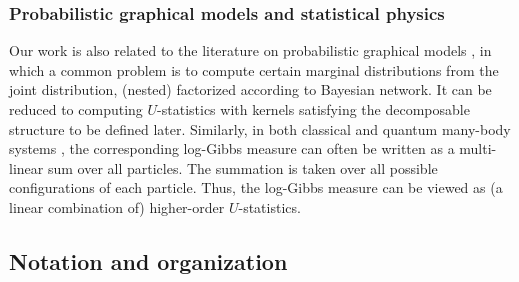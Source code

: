 \documentclass[sn-mathphys, natbib=false]{sn-jnl}
\theoremstyle{plain}
\theoremstyle{definition}
\begin{document}
\begin{bibunit}[agsm]
\subsubsection*{Probabilistic graphical models and statistical physics}

Our work is also related to the literature on probabilistic graphical models \citep{pearl1988probabilistic, shpitser2011efficient}, in which a common problem is to compute certain marginal distributions from the joint distribution, (nested) factorized according to Bayesian network. It can be reduced to computing $U$-statistics with kernels satisfying the decomposable structure to be defined later. Similarly, in both classical \citep{talagrand2010mean, li2020random} and quantum many-body systems \citep{bernaschi2024quantum}, the corresponding log-Gibbs measure can often be written as a multi-linear sum over all particles. The summation is taken over all possible configurations of each particle. Thus, the log-Gibbs measure can be viewed as (a linear combination of) higher-order $U$-statistics.
\fi





\subsection*{Notation and organization}


\end{bibunit}
\end{document}
